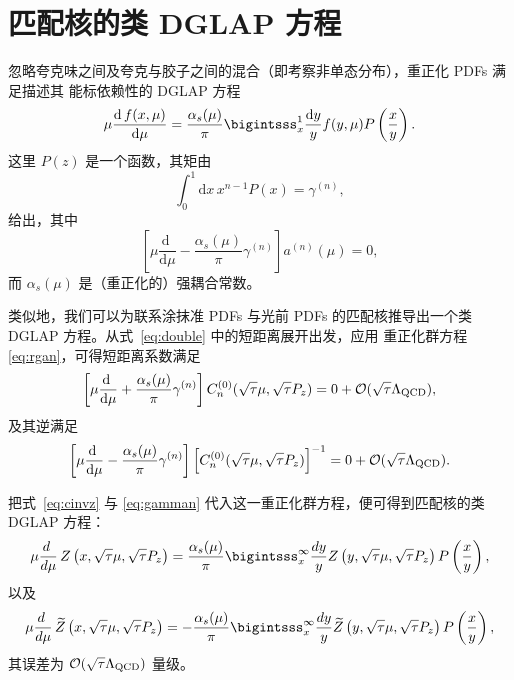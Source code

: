 \section{\label{sec:match}匹配核的类 DGLAP 方程}

忽略夸克味之间及夸克与胶子之间的混合（即考察非单态分布），重正化 PDFs 满足描述其
能标依赖性的 DGLAP 方程
\cite{Gribov:1972rt,Dokshitzer:1977sg,Altarelli:1977zs}
\begin{equation}
\mu\frac{\mathrm{d}\, f(x,\mu)}{\mathrm{d}\mu} = \frac{\alpha_s(\mu)}{\pi}
\bigintsss_x^1
\frac{\mathrm{d}y}{y} f(y,\mu) P\left(\frac{x}{y}\right).
\end{equation}
这里 $P\left(z\right)$ 是一个函数，其矩由
\begin{equation}\label{eq:gamman}
\int_0^1 \mathrm{d}x\, x^{n-1} P(x) = \gamma^{(n)},
\end{equation}
给出，其中
\begin{equation}\label{eq:rgan}
\left[\mu\frac{\mathrm{d}\;}{\mathrm{d}\mu} -\frac{\alpha_s(\mu)}{\pi}
\gamma^{(n)} \right]a^{(n)}(\mu) = 0,
\end{equation}
而 $\alpha_s(\mu)$ 是（重正化的）强耦合常数。

类似地，我们可以为联系涂抹准 PDFs 与光前 PDFs 的匹配核推导出一个类 DGLAP 方程。从式~\eqref{eq:double} 中的短距离展开出发，应用
重正化群方程 \eqref{eq:rgan}，可得短距离系数满足
\begin{equation}
\left[\mu\frac{\mathrm{d}\;}{\mathrm{d}\mu} +
\frac{\alpha_s(\mu)}{\pi}\gamma^{(n)}\right]C_n^{(0)}(\sqrt{\tau}\mu,\sqrt{\tau}
P_z ) = 0+
{\cal
O}(\sqrt{\tau}\Lambda_{\mathrm{QCD}}),
\end{equation}
及其逆满足
\begin{equation}
\left[\mu\frac{\mathrm{d}\;}{\mathrm{d}\mu}-
\frac{\alpha_s(\mu)}{\pi}\gamma^{(n)}\right]
\left[C_n^{(0)}(\sqrt{\tau}\mu,\sqrt{\tau}
P_z)\right]^{-1} = 0+ {\cal
O}(\sqrt{\tau}\Lambda_{\mathrm{QCD}}).
\end{equation}

把式~\eqref{eq:cinvz} 与 \eqref{eq:gamman} 代入这一重正化群方程，便可得到匹配核的类 DGLAP 方程：
\begin{equation}\label{eq:dglapz1}
 \mu\frac{d\;}{d\mu}\,Z\left(x,\sqrt{\tau}\mu, \sqrt{\tau}P_z\right) =
\frac{\alpha_s(\mu)}{\pi} \bigintsss_{x}^\infty \frac{dy}{y}
Z\left(y,\sqrt{\tau}\mu, \sqrt{\tau}P_z\right) P\left(\frac{x}{y}\right),
\end{equation}
以及
\begin{equation}
 \mu\frac{d\;}{d\mu}\,\widetilde{Z}\left(x,\sqrt{\tau}\mu, \sqrt{\tau}P_z\right) =  -
\frac{\alpha_s(\mu)}{\pi} \bigintsss_{x}^\infty \frac{dy}{y}
\widetilde{Z}\left(y,\sqrt{\tau}\mu, \sqrt{\tau}P_z\right) P\left(\frac{x}{y}\right),
\end{equation}
其误差为 ${\cal O}(\sqrt{\tau}\Lambda_{\mathrm{QCD}})$ 量级。


